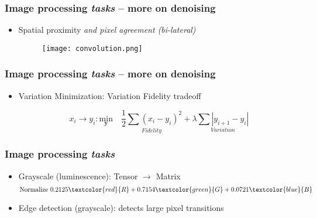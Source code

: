 \documentclass[xcolor={dvipsnames}]{beamer}
\begin{document}
\frame
{
 \frametitle{Image processing \emph{tasks} -- more on denoising}
 
\begin{itemize}
\item<1-> Spatial proximity \emph{and pixel agreement (bi-lateral)}

\begin{figure}
\centering
\texttt{[image: convolution.png]}\\${}$\\${}$\\
\vspace{-.075in}

\vspace{-.95in}


\vspace{-2in}

\end{figure}

\end{itemize}

}

\frame
{
 \frametitle{Image processing \emph{tasks} -- more on denoising}
 
\begin{itemize}
\item Variation Minimization: Variation Fidelity tradeoff

$$ x_i \rightarrow y_i : \underset{\boldsymbol y}{\text{min}} \quad \underset{Fidelity}{\frac{1}{2}\sum(x_i -y_i)^2} + \lambda \underset{Variation}{\sum |y_{i+1}-y_i|}$$
\end{itemize}


}



\frame
{
 \frametitle{Image processing \emph{tasks}}
 
\begin{itemize}
\item<1-> Grayscale (luminescence): Tensor $\rightarrow$ Matrix
$$\text{Normalize } 0.2125\textcolor{red}{R} + 0.7154  \textcolor{green}{G} + 0.0721 \textcolor{blue}{B}$$ 
\item<2-> Edge detection (grayscale): detects large pixel transitions
\end{itemize}

}
\end{document}
